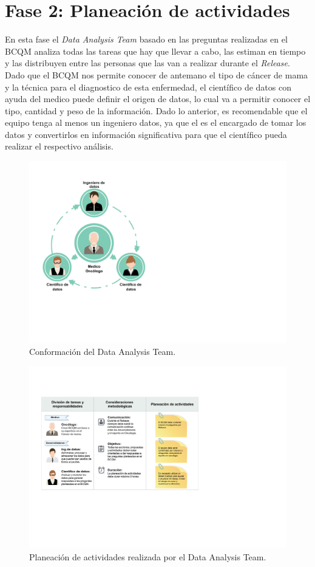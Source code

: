 \section{Fase 2: Planeación de actividades}
En esta fase el \textit{Data Analysis Team} basado en las preguntas realizadas en el BCQM analiza todas las tareas que hay que llevar a cabo, las estiman en tiempo y las distribuyen entre las personas que las van a realizar durante el \textit{Release}. Dado que el BCQM nos permite conocer de antemano el tipo de cáncer de mama y la técnica para el diagnostico de esta enfermedad, el científico de datos con ayuda del medico puede definir el origen de datos, lo cual va a permitir conocer el tipo, cantidad y peso de la información. Dado lo anterior, es recomendable que el equipo tenga al menos un ingeniero datos, ya que el es el encargado de tomar los datos y convertirlos en información significativa para que el científico pueda realizar el respectivo análisis.  

\begin{figure}[!htb]
	\centering
	\includegraphics[width=0.36
	\linewidth]{IMAGENES/Data_Analysis_Team}
	\caption{Conformación del Data Analysis Team. }
	\label{Data_Analysis_Team}
\end{figure}

\begin{figure}[!htb]
	\centering
	\includegraphics[width=0.68
	\linewidth]{IMAGENES/Activity_Planning}
	\caption{Planeación de actividades realizada por el Data Analysis Team. }
	\label{Activity_Planning}
\end{figure}

